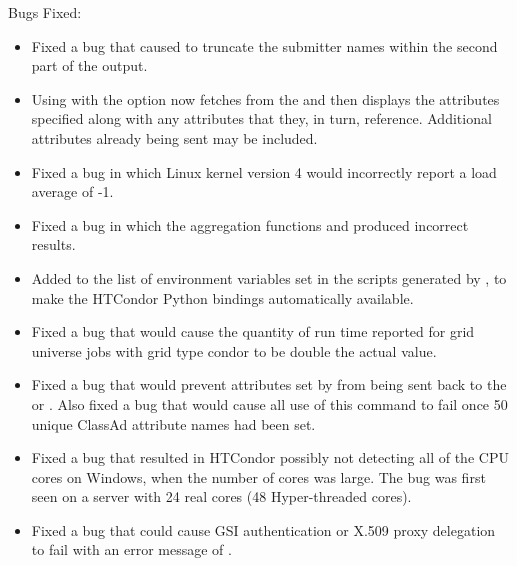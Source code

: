 \noindent Bugs Fixed:

\begin{itemize}

\item Fixed a bug that caused  
 to truncate the submitter names within the second part of
the output.

\item Using   with the  option
now fetches from the  
and then displays the attributes specified along with any attributes that
they, in turn, reference.
Additional attributes already being sent may be included.

\item Fixed a bug in which Linux kernel version 4 would incorrectly report
a load average of -1.

\item Fixed a bug in which the  aggregation functions 
 and  produced incorrect results.

\item Added  to the list of environment variables set in the
scripts generated by , to make the HTCondor Python
bindings automatically available.

\item Fixed a bug that would cause the quantity of run time reported for 
grid universe jobs with grid type condor to be double the actual value.

\item Fixed a bug that would prevent attributes set by  
from being sent back to the  or . Also fixed a bug that would
cause all use of this  command to fail once 50 unique ClassAd attribute names had been set.

\item Fixed a bug that resulted in HTCondor possibly not detecting all of 
the CPU cores on Windows, when the number of cores was large. 
The bug was first seen on a server with 24 real cores (48 Hyper-threaded cores).

\item Fixed a bug that could cause GSI authentication or X.509 proxy
delegation to fail with an error message of
.


\end{itemize}

